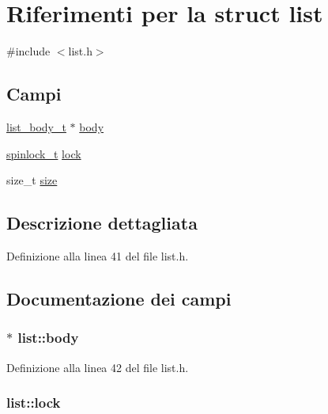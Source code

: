 \hypertarget{structlist}{\section{Riferimenti per la struct list}
\label{structlist}
}


{\ttfamily \#include $<$list.\+h$>$}

\subsection*{Campi}
\begin{DoxyCompactItemize}
\item 
\hyperlink{list_8h_a26009b16c17e2336df1025f49f3ebd7e}{list\+\_\+body\+\_\+t} $\ast$ \hyperlink{structlist_a86cadf6e44fd6505728c5149b336d3db}{body}
\item 
\hyperlink{spinlock_8h_a7d562148dafb0dacf0ee876d482ed090}{spinlock\+\_\+t} \hyperlink{structlist_a38fd85cafd1f71a39e83dd37b37ffbf4}{lock}
\item 
size\+\_\+t \hyperlink{structlist_ae581be90bd8eb7051528b61ad216de88}{size}
\end{DoxyCompactItemize}


\subsection{Descrizione dettagliata}


Definizione alla linea 41 del file list.\+h.



\subsection{Documentazione dei campi}
\hypertarget{structlist_a86cadf6e44fd6505728c5149b336d3db}{
\subsubsection[{body}]{$\ast$ list\+::body}}\label{structlist_a86cadf6e44fd6505728c5149b336d3db}


Definizione alla linea 42 del file list.\+h.

\hypertarget{structlist_a38fd85cafd1f71a39e83dd37b37ffbf4}{
\subsubsection[{lock}]{ list\+::lock}}\label{structlist_a38fd85cafd1f71a39e83dd37b37ffbf4}


